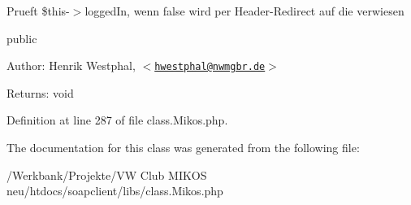 Prueft \$this-$>$loggedIn, wenn false wird per Header-Redirect auf die verwiesen

public \begin{Desc}
\item[Author:]Henrik Westphal, $<$\href{mailto:hwestphal@nwmgbr.de}{\tt hwestphal@nwmgbr.de}$>$ \end{Desc}
\begin{Desc}
\item[Returns:]void \end{Desc}


Definition at line 287 of file class.Mikos.php.

The documentation for this class was generated from the following file:\begin{CompactItemize}
\item 
/Werkbank/Projekte/VW Club MIKOS neu/htdocs/soapclient/libs/class.Mikos.php\end{CompactItemize}
